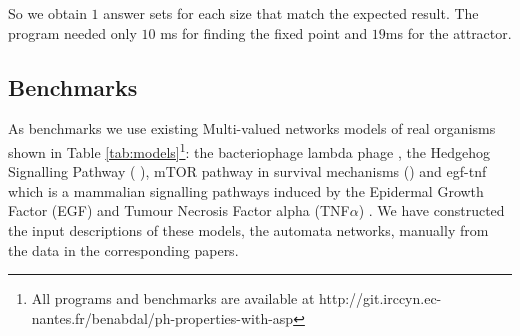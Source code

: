 So we obtain $1$ answer sets for each size that match the expected result. The program needed only $10$ ms for finding the fixed point and $19$ms for the attractor.

\subsection{Benchmarks}
As benchmarks we use existing Multi-valued networks models of real organisms shown in Table \ref{tab:models}\footnote{All programs and benchmarks are available at http://git.irccyn.ec-nantes.fr/benabdal/ph-properties-with-asp}: the bacteriophage lambda phage \cite{thieffry1995dynamical}, the Hedgehog Signalling Pathway ( \cite{stecca2010context}), mTOR pathway in survival mechanisms \cite{javle2010inhibition} () and egf-tnf which is a mammalian signalling pathways induced by the Epidermal Growth Factor (EGF) and Tumour Necrosis Factor alpha (TNF$\alpha$) \cite{chaouiya2013sbml}.
We have constructed the input descriptions of these models, the automata networks, manually from the data in the corresponding papers.

